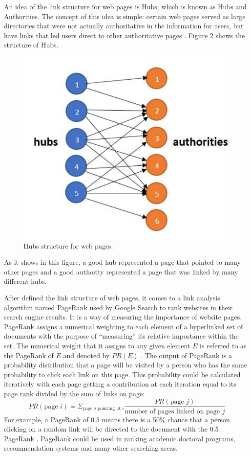 \documentclass[sigconf]{acmart}
\begin{document}
An idea of the link structure for web pages is Hubs, which is known as Hubs and Authorities. The concept of this idea is simple: certain web pages served as large directories that were not actually authoritative in the information for users, but have links that led users direct to other authoritative pages \cite{editor09}. Figure 2 shows the structure of Hubs.
\begin{figure}
\includegraphics[width=1.0\columnwidth]{images/Hubs_structure}
\caption{Hubs structure for web pages.}
\end{figure}
As it shows in this figure, a good hub represented a page that pointed to many other pages and a good authority represented a page that was linked by many different hubs.

After defined the link structure of web pages, it comes to a link analysis algorithm named PageRank used by Google Search to rank websites in their search engine results. It is a way of measuring the importance of website pages. PageRank assigns a numerical weighting to each element of a hyperlinked set of documents with the purpose of ``measuring'' its relative importance within the set. The numerical weight that it assigns to any given element $E$ is referred to as the PageRank of $E$ and denoted by $PR(E)$ \cite{editor10}. The output of PageRank is a probability distribution that a page will be visited by a person who has the same probability to click each link on this page. This probability could be calculated iteratively with each page getting a contribution at each iteration equal to its page rank divided by the sum of links on page:
\[PR(\text{page } i)=\Sigma_{\text{page } j \text{ pointing at } i}\dfrac{PR(\text{page } j)}{\text{number of pages linked on page } j}\]
For example, a PageRank of 0.5 means there is a 50\% chance that a person clicking on a random link will be directed to the document with the 0.5 PageRank \cite{editor10}. PageRank could be used in ranking academic doctoral programs, recommendation systems and many other searching areas.
    
\end{document}
